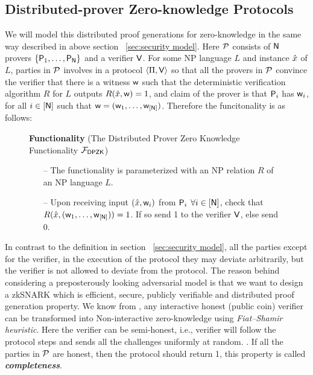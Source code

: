 \subsection{Distributed-prover Zero-knowledge Protocols}

\noindent We will model this distributed proof generations for zero-knowledge in the same way described in above section ~\ref{sec:security model}. Here $\mathcal{P}$ consists of $\mathsf{N}$ provers $\{\mathsf{P}_1, \ldots, \mathsf{P}_{\mathsf{N}}\}$ and a verifier $\mathsf{V}$. For some NP language $L$ and instance $\hat{x}$ of $L$, parties in $\mathcal{P}$ involves in a protocol $\langle \Pi,\mathsf{V}\rangle$ so that all the provers in $\mathcal{P}$ convince the verifier that there is a witness $\mathsf{w}$ such that the deterministic verification algorithm $R$ for $L$ outputs $R(\hat{x},\mathsf{w}) = 1$, and claim of the prover is that $\mathsf{P}_i$ has $\mathsf{w}_i$, for all $i\in[\mathsf{N}]$ such that $\mathsf{w} = (\mathsf{w}_1, \ldots, \mathsf{w}_{[\mathsf{N}]})$. Therefore the funcitonality is as follows: 
\begin{figure}[H]\label{func:DPZK}
	\centering
	\begin{framed}
		\textbf{Functionality} (The Distributed Prover Zero Knowledge Functionality $\mathcal{F}_{\mathsf{DPZK}}$)
		\begin{itemize}
			\item[--] The functionality is parameterized with an NP relation $R$ of an NP language $L$.
			\item[--] Upon receiving input $(\hat{x}, \mathsf{w}_i)$ from $\mathsf{P}_i$ $\forall i\in[\mathsf{N}]$, check that $R(\hat{x}, (\mathsf{w}_1, \ldots, \mathsf{w}_{[\mathsf{N}]})) = 1$. If so send 1 to the verifier $\mathsf{V}$, else send 0. 
		\end{itemize}
	\end{framed}
\end{figure} 
In contrast to the definition in section ~\ref{sec:security model}, all the parties except for the verifier, in the execution of the protocol they may deviate arbitrarily, but the verifier is not allowed to deviate from the protocol. The reason behind considering a preposterously looking adversarial model is that we want to design a zkSNARK which is efficient, secure, publicly verifiable and distributed proof generation property. We know from \cite{}, any interactive honest (public coin) verifier can be transformed into Non-interactive zero-knowledge using \textit{Fiat–Shamir heuristic}. Here the verifier can be semi-honest, i.e., verifier will follow the protocol steps and sends all the challenges uniformly at random.
.
If all the parties in $\mathcal{P}$ are honest, then the protocol should return 1, this property is called \textbf{\textit{completeness}}.

